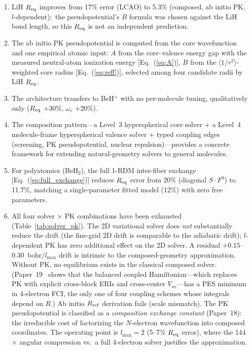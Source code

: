 \documentclass[aps,pra,twocolumn,superscriptaddress,longbibliography,floatfix]{revtex4-2}
\begin{document}
\begin{enumerate}
\item LiH $R_{\rm eq}$ improves from 17\% error (LCAO) to 5.3\%
  (composed, ab initio PK, $l$-dependent);\ the pseudopotential's
  $B$ formula was chosen against the LiH bond length, so this
  $R_{\rm eq}$ is not an independent prediction.

\item The ab initio PK pseudopotential is computed from the
  core wavefunction and one empirical atomic input: $A$ from the
  core--valence energy gap with the measured neutral-atom ionization
  energy [Eq.~(\ref{eq:A})], $B$ from the $\langle 1/r^2 \rangle$-weighted
  core radius [Eq.~(\ref{eq:reff})], selected among four candidate
  radii by LiH $R_{\rm eq}$.

\item The architecture transfers to BeH$^+$ with no per-molecule
  tuning, qualitatively only ($R_{\rm eq}$ $+30\%$, $\omega_e$ $+20\%$).

\item The composition pattern---a Level~3 hyperspherical core solver +
  a Level~4 molecule-frame hyperspherical valence solver + typed coupling
  edges (screening, PK pseudopotential, nuclear repulsion)---provides a
  concrete framework for extending natural-geometry solvers to general
  molecules.

\item For polyatomics (BeH$_2$), the full 1-RDM inter-fiber exchange
  [Eq.~(\ref{eq:full_exchange})] reduces $R_{\rm eq}$ error from
  20\% (diagonal $S \cdot F^0$) to 11.7\%, matching a single-parameter
  fitted model (12\%) with zero free parameters.

\item All four solver $\times$ PK combinations have been exhausted
  (Table~\ref{tab:solver_pk}).  The 2D variational solver does
  \emph{not} substantially reduce the drift (the fine-grid 2D drift
  is comparable to the adiabatic drift); $l$-dependent PK has zero
  additional effect on the 2D
  solver.  A residual $+0.15$--$0.30$~bohr/$l_{\max}$ drift is
  intrinsic to the composed-geometry approximation.  Without PK,
  no equilibrium exists in the classical composed solver.
  (Paper~19~\cite{loutey_paper19} shows that the balanced coupled
  Hamiltonian---which replaces PK with explicit cross-block ERIs
  and cross-center $V_{ne}$---has a PES minimum in 4-electron
  FCI, the only one of four coupling schemes whose integrals depend
  on $R$.)
  Ab initio $R_{\rm ref}$ derivation fails
  (scale mismatch).  The PK pseudopotential is classified as a
  \emph{composition exchange constant} (Paper~18): the irreducible
  cost of factorizing the $N$-electron wavefunction into composed
  coordinates.  The operating point is $l_{\max} = 2$ (5--7\%
  $R_{\rm eq}$ error), where the 144$\times$ angular compression
  vs.\ a full 4-electron solver justifies the approximation.
\end{enumerate}
\end{document}

